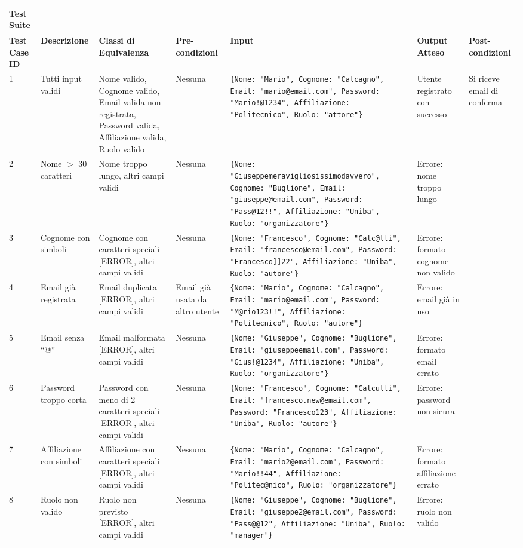 \begin{tabular}{|p{2cm}|p{2cm}|p{2cm}|p{2cm}|p{4cm}|p{2cm}|p{2cm}|}
\hline
\rowcolor{SkyBlue}
\textbf{Test Suite} & & & & & &\\
\hline
\rowcolor{Red}
\textbf{Test Case ID} & \textbf{Descrizione} & \textbf{Classi di Equivalenza} & \textbf{Pre-condizioni} & \textbf{Input} & \textbf{Output Atteso} & \textbf{Post-condizioni} \\
\hline
1 & Tutti input validi & Nome valido, Cognome valido, Email valida non registrata, Password valida, Affiliazione valida, Ruolo valido & Nessuna & \texttt{\{Nome: "Mario", Cognome: "Calcagno", Email: "mario@email.com", Password: "Mario!@1234", Affiliazione: "Politecnico", Ruolo: "attore"\}} & Utente registrato con successo & Si riceve email di conferma \\
\hline
2 & Nome $>$ 30 caratteri & Nome troppo lungo, altri campi validi & Nessuna & \texttt{\{Nome: "Giuseppemeravigliosissimodavvero", Cognome: "Buglione", Email: "giuseppe@email.com", Password: "Pass@12!!", Affiliazione: "Uniba", Ruolo: "organizzatore"\}} & Errore: nome troppo lungo & \\
\hline
3 & Cognome con simboli & Cognome con caratteri speciali [ERROR], altri campi validi & Nessuna & \texttt{\{Nome: "Francesco", Cognome: "Calc@lli", Email: "francesco@email.com", Password: "Francesco]]22", Affiliazione: "Uniba", Ruolo: "autore"\}} & Errore: formato cognome non valido & \\
\hline
4 & Email già registrata & Email duplicata [ERROR], altri campi validi & Email già usata da altro utente & \texttt{\{Nome: "Mario", Cognome: "Calcagno", Email: "mario@email.com", Password: "M@rio123!!", Affiliazione: "Politecnico", Ruolo: "autore"\}} & Errore: email già in uso & \\
\hline
5 & Email senza “@” & Email malformata [ERROR], altri campi validi & Nessuna & \texttt{\{Nome: "Giuseppe", Cognome: "Buglione", Email: "giuseppeemail.com", Password: "Gius!@1234", Affiliazione: "Uniba", Ruolo: "organizzatore"\}} & Errore: formato email errato & \\
\hline
6 & Password troppo corta & Password con meno di 2 caratteri speciali [ERROR], altri campi validi & Nessuna & \texttt{\{Nome: "Francesco", Cognome: "Calculli", Email: "francesco.new@email.com", Password: "Francesco123", Affiliazione: "Uniba", Ruolo: "autore"\}} & Errore: password non sicura & \\
\hline
7 & Affiliazione con simboli & Affiliazione con caratteri speciali [ERROR], altri campi validi & Nessuna & \texttt{\{Nome: "Mario", Cognome: "Calcagno", Email: "mario2@email.com", Password: "Mario!!44", Affiliazione: "Politec@nico", Ruolo: "organizzatore"\}} & Errore: formato affiliazione errato & \\
\hline
8 & Ruolo non valido & Ruolo non previsto [ERROR], altri campi validi & Nessuna & \texttt{\{Nome: "Giuseppe", Cognome: "Buglione", Email: "giuseppe2@email.com", Password: "Pass@@12", Affiliazione: "Uniba", Ruolo: "manager"\}} & Errore: ruolo non valido & \\
\hline
\end{tabular}
